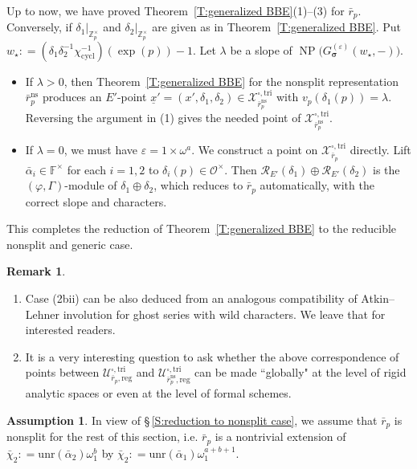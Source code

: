 \documentclass[12pt]{amsart}
\theoremstyle{definition}
\newtheorem{assumption}[subsection]{Assumption}
\newtheorem{remark}[subsection]{Remark}
\numberwithin{equation}{subsection}
\def\calO{\mathcal{O}}
\def\calR{\mathcal{R}}
\def\calU{\mathcal{U}}
\def\calX{\mathcal{X}}
\def\FF{\mathbb{F}}
\def\ZZ{\mathbb{Z}}
\DeclareMathOperator{\NP}{NP}
\newcommand{\bbsigma}{\boldsymbol{\sigma}}
\newcommand{\cycl}{\mathrm{cycl}}
\newcommand{\unr}{\mathrm{unr}}
\newcommand{\tri}{\mathrm{tri}}
\newcommand{\reg}{\mathrm{reg}}
\begin{document}
Up to now, we have proved Theorem~\ref{T:generalized BBE}(1)--(3) for $\bar r_p$.  Conversely, if $\delta_1|_{\ZZ_p^\times}$ and $\delta_2|_{\ZZ_p^\times}$ are given as in Theorem~\ref{T:generalized BBE}. Put $w_\star: = (\delta_1\delta_2^{-1}\chi_\cycl^{-1})(\exp(p))-1$.
Let $\lambda$ be a slope of $\NP\big(G_{\bbsigma}^{(\varepsilon)}(w_\star, -)\big)$.
\begin{itemize}
\item [(1)'] If $\lambda>0$, then Theorem~\ref{T:generalized BBE} for the nonsplit representation $\bar r_p^\mathrm{ns}$ produces an $E'$-point $\underline x' =(x', \delta_1, \delta_2) \in \calX_{\bar r_p^\mathrm{ns}}^{\square, \tri}$ with $v_p(\delta_1(p)) = \lambda$. Reversing the argument in (1) gives the needed point of $\calX_{\bar r^\mathrm{ns}_p}^{\square, \tri}$. 
\item[(2)'] If $\lambda =0$, we must have $\varepsilon = 1\times \omega^a$. We construct a point on $\calX_{\bar r_p}^{\square, \tri}$ directly.  Lift $\bar \alpha_i \in \FF^\times$ for each $i=1,2$ to $\delta_i(p) \in \calO^\times$. Then $\calR_{E'}(\delta_1) \oplus \calR_{E'}(\delta_2)$ is the $(\varphi, \Gamma)$-module of $\delta_1 \oplus \delta_2$, which reduces to $\bar r_p$ automatically, with the correct slope and characters.
\end{itemize}
This completes the reduction of Theorem~\ref{T:generalized BBE} to the reducible nonsplit and generic case.

\begin{remark}
\begin{enumerate}
\item Case (2bii) can be also deduced from an analogous compatibility of Atkin--Lehner involution for ghost series with wild characters. We leave that for interested readers.
\item
It is a very interesting question to ask whether the above correspondence of points between $\calU_{\bar r_p, \reg}^{\square, \tri}$ and $\calU_{\bar r_p^\mathrm{ns}, \reg}^{\square, \tri}$ can be made ``globally" at the level of rigid analytic spaces or even at the level of formal schemes.
\end{enumerate}
\end{remark}

\begin{assumption}
\label{A:assumption on bar rp}
In view of \S\,\ref{S:reduction to nonsplit case}, we assume that $\bar r_p$ is nonsplit for the rest of this section, i.e. $\bar r_p$ is a nontrivial extension of $\bar \chi_2: = \unr(\bar\alpha_2)\omega_1^b$ by $\bar\chi_2: = \unr(\bar\alpha_1) \omega_1^{a+b+1}$.
\end{assumption}
\end{document}
